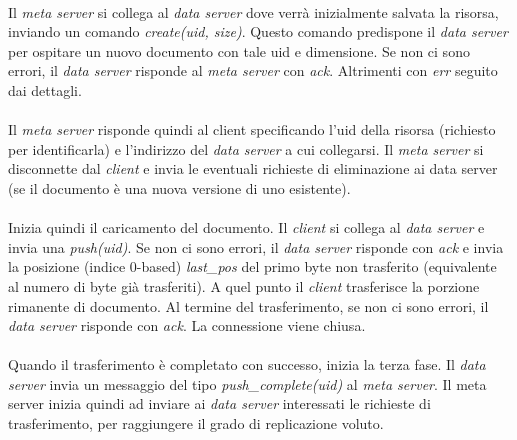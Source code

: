 \documentclass[11pt,a4paper,english]{article}
\begin{document}
\paragraph{} Il \emph{meta server} si collega al \emph{data server} dove verrà inizialmente salvata la risorsa, inviando un comando \emph{create(uid, size)}. Questo comando predispone il \emph{data server} per ospitare un nuovo documento con tale uid e dimensione. Se non ci sono errori, il \emph{data server} risponde al \emph{meta server} con \emph{ack}. Altrimenti con \emph{err} seguito dai dettagli.

\paragraph{} Il \emph{meta server} risponde quindi al client specificando l'uid della risorsa (richiesto per identificarla) e l'indirizzo del \emph{data server} a cui collegarsi. Il \emph{meta server} si disconnette dal \emph{client} e invia le eventuali richieste di eliminazione ai data server (se il documento è una nuova versione di uno esistente).

\paragraph{} Inizia quindi il caricamento del documento. Il \emph{client} si collega al \emph{data server} e invia una \emph{push(uid)}. Se non ci sono errori, il \emph{data server} risponde con \emph{ack} e invia la posizione (indice 0-based) \emph{last\_pos} del primo byte non trasferito (equivalente al numero di byte già trasferiti). A quel punto il \emph{client} trasferisce la porzione rimanente di documento. Al termine del trasferimento, se non ci sono errori, il \emph{data server} risponde con \emph{ack}. La connessione viene chiusa.

\paragraph{} Quando il trasferimento è completato con successo, inizia la terza fase. Il \emph{data server} invia un messaggio del tipo \emph{push\_complete(uid)} al \emph{meta server}. Il meta server inizia quindi ad inviare ai \emph{data server} interessati le richieste di trasferimento, per raggiungere il grado di replicazione voluto.
\end{document}

